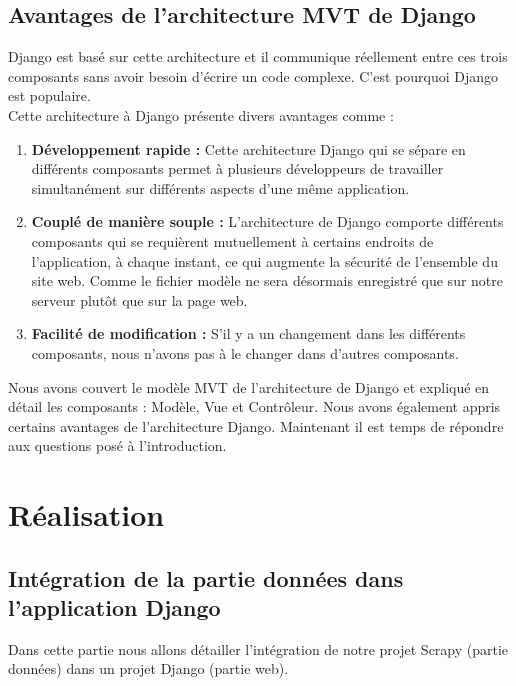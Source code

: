 \subsection{Avantages de l'architecture MVT de Django}
Django est basé sur cette architecture et il communique réellement entre ces trois composants sans avoir besoin d'écrire un code complexe. C'est pourquoi Django est populaire.\\
Cette architecture à Django présente divers avantages comme :\\

\begin{enumerate}
    \item \textbf{Développement rapide :} Cette architecture Django qui se sépare en différents composants  permet à plusieurs développeurs de travailler simultanément sur différents aspects d'une même application.
    \item \textbf{Couplé de manière souple :} L'architecture de Django comporte différents composants qui se requièrent mutuellement à certains endroits de l'application, à chaque instant, ce qui augmente la sécurité de l'ensemble du site web. Comme le fichier modèle ne sera désormais enregistré que sur notre serveur plutôt que sur la page web.
    \item \textbf{Facilité de modification :} S'il y a un changement dans les différents composants, nous n'avons pas à le changer dans d'autres composants.\\
\end{enumerate}
 

Nous avons couvert le modèle MVT de l'architecture de Django et expliqué en détail les composants : Modèle, Vue et Contrôleur. Nous avons également appris certains avantages de l'architecture Django. Maintenant il est temps de répondre aux questions posé à l'introduction.
\section{Réalisation}
\subsection{Intégration de la partie données dans l'application Django}
Dans cette partie nous allons détailler l'intégration de notre projet Scrapy (partie données) dans un projet Django (partie web).
